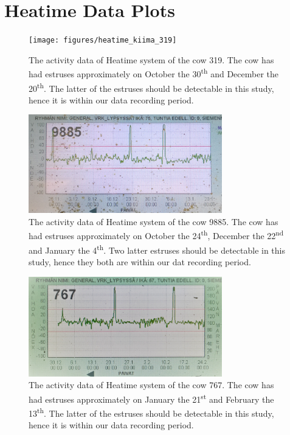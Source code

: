 \clearpage
\section{Heatime Data Plots}

\begin{figure}[h]
\centering
\texttt{[image: figures/heatime\_kiima\_319]}
\caption{The activity data of Heatime system of the cow 319. The cow has had estruses approximately on October the 30\textsuperscript{th} and December the 20\textsuperscript{th}. The latter of the estruses should be detectable in this study, hence it is within our data recording period.}
\label{heatime_kiima_319}
\end{figure}


\begin{figure}[h]
\centering
\includegraphics[width = 0.75\textwidth]{figures/heatime_kiima_9885}
\caption{The activity data of Heatime system of the cow 9885. The cow has had estruses approximately on October the 24\textsuperscript{th}, December the 22\textsuperscript{nd} and January the 4\textsuperscript{th}. Two latter estruses should be detectable in this study, hence they both are within our dat recording period. }
\label{heatime_kiima_9885}
\end{figure}

\begin{figure}[h]
\centering
\includegraphics[width = 0.75\textwidth]{figures/heatime_kiima_767}
\caption{The activity data of Heatime system of the cow 767. The cow has had estruses approximately on January the 21\textsuperscript{st} and February the 13\textsuperscript{th}. The latter of the estruses should be detectable in this study, hence it is within our data recording period.}
\label{heatime_kiima_767_2}
\end{figure}

